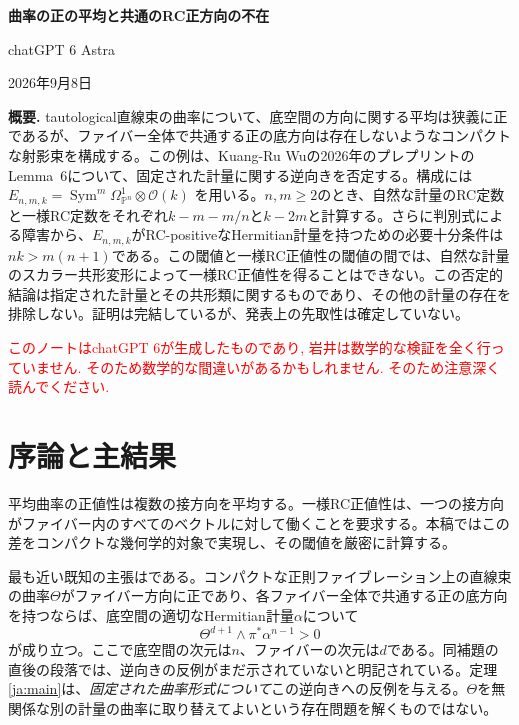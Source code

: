 \documentclass[12pt]{amsart}
\theoremstyle{definition}
\theoremstyle{remark}
\numberwithin{equation}{section}
\DeclareMathOperator{\Sym}{Sym}
\newcommand{\xr}[1]{\textcolor{red}{#1}}
\newcommand{\Pp}{\mathbb P}
\begin{document}
\newpage
\setcounter{section}{0}
\setcounter{equation}{0}
\setcounter{thm}{0}
\setcounter{footnote}{0}
\renewcommand{\theHsection}{ja.\arabic{section}}
\renewcommand{\theHequation}{ja.\theequation}
\providecommand{\theHthm}{\thethm}
\renewcommand{\theHthm}{ja.\thethm}
\renewcommand{\proofname}{証明}
\begin{center}
{\Large\bfseries 曲率の正の平均と共通のRC正方向の不在}\par\medskip
{\normalsize chatGPT 6 Astra}\par\smallskip
{\small 2026年9月8日}
\end{center}
\medskip
\noindent\textbf{概要.}
tautological直線束の曲率について、底空間の方向に関する平均は狭義に正であるが、ファイバー全体で共通する正の底方向は存在しないようなコンパクトな射影束を構成する。この例は、Kuang-Ru Wuの2026年のプレプリントのLemma~6について、固定された計量に関する逆向きを否定する。構成には
$E_{n,m,k}=\Sym^m\Omega^1_{\Pp^n}\otimes\mathcal O(k)$
を用いる。$n,m\ge2$のとき、自然な計量のRC定数と一様RC定数をそれぞれ$k-m-m/n$と$k-2m$と計算する。さらに判別式による障害から、$E_{n,m,k}$がRC-positiveなHermitian計量を持つための必要十分条件は$nk>m(n+1)$である。この閾値と一様RC正値性の閾値の間では、自然な計量のスカラー共形変形によって一様RC正値性を得ることはできない。この否定的結論は指定された計量とその共形類に関するものであり、その他の計量の存在を排除しない。証明は完結しているが、発表上の先取性は確定していない。


\xr{このノートはchatGPT 6が生成したものであり, 岩井は数学的な検証を全く行っていません. そのため数学的な間違いがあるかもしれません. そのため注意深く読んでください.}


\section{序論と主結果}

平均曲率の正値性は複数の接方向を平均する。一様RC正値性は、一つの接方向がファイバー内のすべてのベクトルに対して働くことを要求する。本稿ではこの差をコンパクトな幾何学的対象で実現し、その閾値を厳密に計算する。

最も近い既知の主張は\cite[Lemma~6]{ja:Wu26}である。コンパクトな正則ファイブレーション上の直線束の曲率$\Theta$がファイバー方向に正であり、各ファイバー全体で共通する正の底方向を持つならば、底空間の適切なHermitian計量$\alpha$について
\[
\Theta^{d+1}\wedge\pi^*\alpha^{n-1}>0
\]
が成り立つ。ここで底空間の次元は$n$、ファイバーの次元は$d$である。同補題の直後の段落では、逆向きの反例がまだ示されていないと明記されている。定理\ref{ja:main}は、\emph{固定された曲率形式について}この逆向きへの反例を与える。$\Theta$を無関係な別の計量の曲率に取り替えてよいという存在問題を解くものではない。
\end{document}
